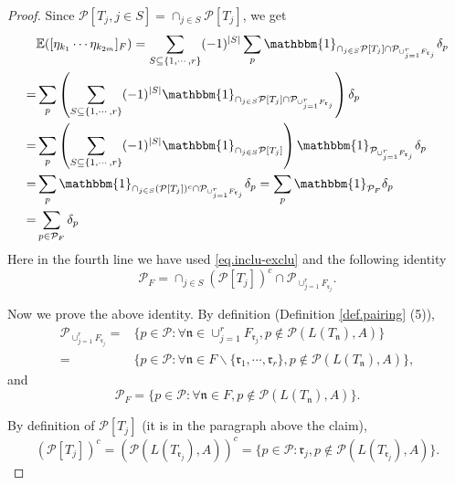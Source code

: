 \begin{proof}
 
 Since $\mathcal{P}[T_j,j\in S]=\cap_{j\in S}\mathcal{P}[T_j]$, we get
 \begin{equation}
  \begin{split}
  &\mathbb{E}([\eta_{k_1}\cdots \eta_{k_{2m}}]_F)=\sum_{S\subseteq\{1,\cdots,r\}}(-1)^{|S|}\sum_{p} \mathbbm{1}_{\cap_{j\in S}\mathcal{P}[T_j]\cap \mathcal{P}_{\cup_{j=1}^r F_{\mathfrak{r}_{j}}}} 
  \delta_p
  \\
  =&\sum_{p} \left(\sum_{S\subseteq\{1,\cdots,r\}}(-1)^{|S|}\mathbbm{1}_{\cap_{j\in S}\mathcal{P}[T_j]\cap \mathcal{P}_{\cup_{j=1}^r F_{\mathfrak{r}_{j}}}} \right)\delta_p 
  \\
  =& \sum_{p} \left(\sum_{S\subseteq\{1,\cdots,r\}}(-1)^{|S|}\mathbbm{1}_{\cap_{j\in S}\mathcal{P}[T_j]} \right)\mathbbm{1}_{ \mathcal{P}_{\cup_{j=1}^r F_{\mathfrak{r}_{j}}}}\delta_p
  \\
  =&\sum_{p} \mathbbm{1}_{\cap_{j\in S}(\mathcal{P}[T_j])^c\cap \mathcal{P}_{\cup_{j=1}^r F_{\mathfrak{r}_{j}}}} 
  \delta_p=\sum_{p} \mathbbm{1}_{\mathcal{P}_F} 
  \delta_p
  \\
  =&\sum_{p\in \mathcal{P}_F} \delta_p
  \end{split}
 \end{equation}
 Here in the fourth line we have used \eqref{eq.inclu-exclu} and the following identity
 \begin{equation}\label{eq.lemrenorm5}
  \mathcal{P}_F = \cap_{j\in S}(\mathcal{P}[T_j])^c\cap \mathcal{P}_{\cup_{j=1}^r F_{\mathfrak{r}_{j}}}.
 \end{equation}
 
 Now we prove the above identity. By definition (Definition \ref{def.pairing} (5)), 
 \begin{equation}
  \begin{split}
  \mathcal{P}_{\cup_{j=1}^r F_{\mathfrak{r}_{j}}}=&\{p\in\mathcal{P}:\forall \mathfrak{n}\in \cup_{j=1}^r F_{\mathfrak{r}_{j}},p\notin \mathcal{P}(L(T_{\mathfrak{n}}),A)\}
  \\
  =&\{p\in\mathcal{P}:\forall \mathfrak{n}\in F\backslash \{\mathfrak{r}_1,\cdots,\mathfrak{r}_r\},p\notin \mathcal{P}(L(T_{\mathfrak{n}}),A)\},
  \end{split}
 \end{equation}
 and 
 \begin{equation}
  \mathcal{P}_F=\{p\in\mathcal{P}:\forall \mathfrak{n}\in F,p\notin \mathcal{P}(L(T_{\mathfrak{n}}),A)\}.
 \end{equation}
 
 By definition of $\mathcal{P}[T_j]$ (it is in the paragraph above the claim), 
 \begin{equation}
  (\mathcal{P}[T_j])^c = (\mathcal{P}(L(T_{\mathfrak{r}_j}),A))^c = \{p\in\mathcal{P}:\mathfrak{r}_j,p\notin \mathcal{P}(L(T_{\mathfrak{r}_j}),A)\}.
 \end{equation}
 

\end{proof}
